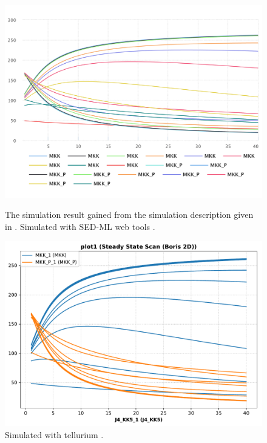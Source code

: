 \begin{figure}[ht]
    \centering
    \begin{minipage}{0.47\textwidth}
        \centering
        \includegraphics[width=1.0\textwidth]{examples/parameter-scan-2d/results/sedml_webtools/plot1}
        \caption{The simulation result gained from the simulation description given in . Simulated with SED-ML web tools \citep{bergmann2017sed}.}
    \end{minipage}\hfill
    \begin{minipage}{0.47\textwidth}
        \centering
                \includegraphics[width=1.0\textwidth]{examples/parameter-scan-2d/results/tellurium/plot1}
        \caption{Simulated with tellurium \citep{tellurium}.}
    \end{minipage}
    \label{fig:parameter-scan-2d}
\end{figure}

